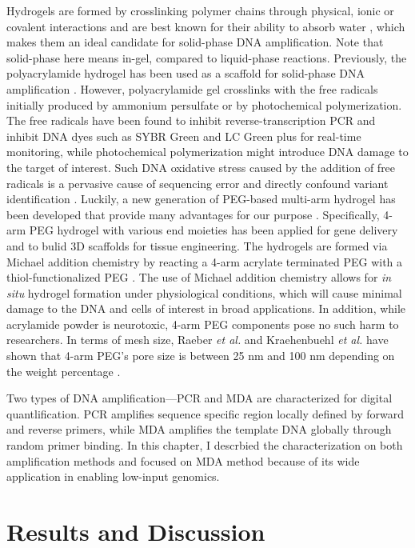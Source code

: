 Hydrogels are formed by crosslinking polymer chains through physical, ionic or covalent interactions and are best known for their ability to absorb water \cite{Elisseeff:2008cm}, which makes them an ideal candidate for solid-phase DNA amplification. Note that solid-phase here means in-gel, compared to liquid-phase reactions. Previously, the polyacrylamide hydrogel has been used as a scaffold for solid-phase DNA amplification \cite{Mitra:1999ty}. However, polyacrylamide gel crosslinks with the free radicals initially produced by ammonium persulfate or by photochemical polymerization. The free radicals have been found to inhibit reverse-transcription PCR and inhibit DNA dyes such as SYBR Green and LC Green plus \cite{Atrazhev:2010ex} for real-time monitoring, while photochemical polymerization might introduce DNA damage to the target of interest. Such DNA oxidative stress caused by the addition of free radicals is a pervasive cause of sequencing error and directly confound variant identification \cite{Chen:2017dq}. Luckily, a new generation of PEG-based multi-arm hydrogel has been developed that provide many advantages for our purpose \cite{Tan:2010by}. Specifically, 4-arm PEG hydrogel with various end moieties has been applied for gene delivery and to bulid 3D scaffolds for tissue engineering. The hydrogels are formed via Michael addition chemistry by reacting a 4-arm acrylate terminated PEG with a thiol-functionalized PEG \cite{Li:2012bd}. The use of Michael addition chemistry allows for \textit{in situ} hydrogel formation under physiological conditions, which will cause minimal damage to the DNA and cells of interest in broad applications. In addition, while acrylamide powder is neurotoxic, 4-arm PEG components pose no such harm to researchers. In terms of mesh size, Raeber \textit{et al.} and Kraehenbuehl \textit{et al.} have shown that 4-arm PEG's pore size is between 25 nm and 100 nm depending on the weight percentage \cite{Raeber:2005cq,Kraehenbuehl:2008do}.


Two types of DNA amplification---PCR and MDA are characterized for digital quantlification. PCR amplifies sequence specific region locally defined by forward and reverse primers, while MDA amplifies the template DNA globally through random primer binding. In this chapter, I descrbied the characterization on both amplification methods and focused on MDA method because of its wide application in enabling low-input genomics. 


\section{Results and Discussion}
